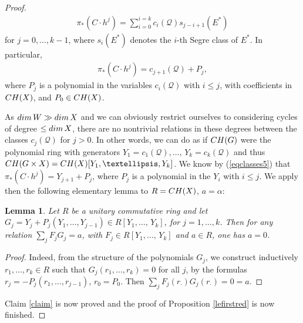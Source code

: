 \documentclass[10pt,a4paper]{amsart}
\newtheorem{lemm}{Lemma}
\begin{document}
\begin{proof}
\begin{eqnarray}\label{eqclasses} \pi_*(C\cdot h^j)=\sum_{i=0}^{i=k} c_i(\mathcal{Q})s_{j-i+1}(E^*)
\end{eqnarray}
for $j=0,\ldots,k-1$, where $s_i(E^*)$ denotes the $i$-th Segre class of $E^*$.
In particular,
\begin{eqnarray}\label{eqclasses5}\pi_*(C\cdot h^j)=c_{j+1}(\mathcal{Q})+P_j,\end{eqnarray} where $P_j$ is a polynomial
in the variables  $c_i(\mathcal{Q})$ with $i\leq j$, with coefficients in ${\rm CH}(X)$, and $P_0\in{\rm CH}(X)$.

 As ${\rm dim}\,W\gg {\rm dim}\,X$ and we can obviously restrict ourselves to  considering cycles of degree
$\leq {\rm dim}\,X$, there are no nontrivial relations in these degrees between the classes
$c_j(\mathcal{Q})$ for $j>0$. In other words, we can do as if ${\rm CH}(G)$ were the
 polynomial ring with generators
$Y_1=c_1(\mathcal{Q}),\ldots,\,Y_k=c_k(\mathcal{Q})$ and thus ${\rm CH}(G\times X)={\rm CH}(X)[Y_1,\ldots, Y_k]$. We know by (\ref{eqclasses5}) that
$\pi_*(C\cdot h^j)=Y_{j+1}+P_j$, where $P_j$ is a polynomial
in the $Y_{i}$ with $i\leq j$.
We apply  then the following elementary lemma to $R={\rm CH}(X)$, $a=\alpha$:
\begin{lemm} Let $R$ be a unitary commutative ring and
let $G_j=Y_j+P_j(Y_1,\ldots,Y_{j-1})\in R[Y_1,\ldots,\,Y_k]$, for $j=1,\ldots, k$. Then
for any relation $\sum_jF_j G_j=a$, with
$F_j\in R[Y_1,\ldots,\,Y_k]$ and  $a\in R$, one has $a=0$.
\end{lemm}
\begin{proof} Indeed, from the structure of the polynomials
$G_j$, we  construct inductively  $r_1,\ldots,r_k\in R$ such that
$G_j(r_1,\ldots, r_k)=0$ for all $j$, by the formulas $r_j=-P_j(r_1,\ldots,r_{j-1})$, $r_0=P_0$. Then $\sum_jF_j(r_\cdot)G_j(r_\cdot)=0=a$.
\end{proof}
Claim \ref{claim} is now proved and the proof of Proposition \ref{lefirstred} is now finished.
\end{proof}
\end{document}
